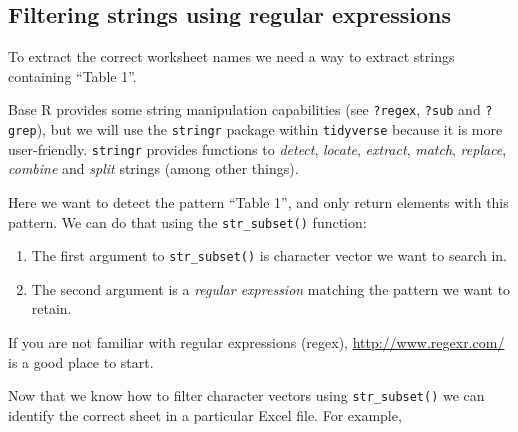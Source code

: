 \documentclass[]{book}
\newenvironment{Shaded}{\begin{snugshade}}{\end{snugshade}}
\newcommand{\KeywordTok}[1]{\textcolor[rgb]{0.13,0.29,0.53}{\textbf{#1}}}
\newcommand{\DataTypeTok}[1]{\textcolor[rgb]{0.13,0.29,0.53}{#1}}
\newcommand{\DecValTok}[1]{\textcolor[rgb]{0.00,0.00,0.81}{#1}}
\newcommand{\StringTok}[1]{\textcolor[rgb]{0.31,0.60,0.02}{#1}}
\newcommand{\CommentTok}[1]{\textcolor[rgb]{0.56,0.35,0.01}{\textit{#1}}}
\newcommand{\OperatorTok}[1]{\textcolor[rgb]{0.81,0.36,0.00}{\textbf{#1}}}
\newcommand{\NormalTok}[1]{#1}
\providecommand{\tightlist}{%
  \setlength{\itemsep}{0pt}\setlength{\parskip}{0pt}}
\begin{document}
\subsection{Filtering strings using regular
expressions}\label{filtering-strings-using-regular-expressions}

To extract the correct worksheet names we need a way to extract strings
containing ``Table 1''.

Base R provides some string manipulation capabilities (see
\texttt{?regex}, \texttt{?sub} and \texttt{?grep}), but we will use the
\texttt{stringr} package within \texttt{tidyverse} because it is more
user-friendly. \texttt{stringr} provides functions to \emph{detect},
\emph{locate}, \emph{extract}, \emph{match}, \emph{replace},
\emph{combine} and \emph{split} strings (among other things).

Here we want to detect the pattern ``Table 1'', and only return elements
with this pattern. We can do that using the \texttt{str\_subset()}
function:

\begin{enumerate}
\def\labelenumi{\arabic{enumi}.}
\tightlist
\item
  The first argument to \texttt{str\_subset()} is character vector we
  want to search in.
\item
  The second argument is a \emph{regular expression} matching the
  pattern we want to retain.
\end{enumerate}

If you are not familiar with regular expressions (regex),
\url{http://www.regexr.com/} is a good place to start.

Now that we know how to filter character vectors using
\texttt{str\_subset()} we can identify the correct sheet in a particular
Excel file. For example,

\begin{Shaded}
\end{Shaded}
\end{document}
